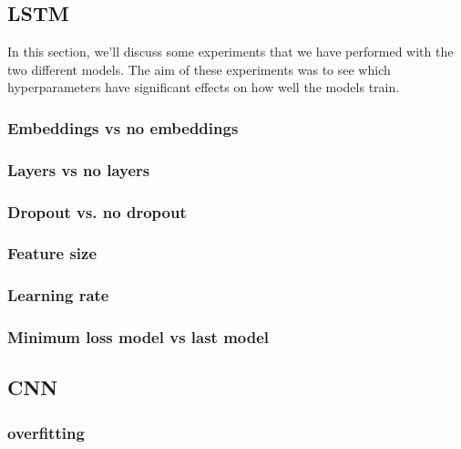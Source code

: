 \subsection{LSTM}  %
In this section, we'll discuss some experiments that we have performed with the two different models. The aim of these experiments was to see which hyperparameters have significant effects on how well the models train.

\subsubsection{Embeddings vs no embeddings} %

\subsubsection{Layers vs no layers}

\subsubsection{Dropout vs. no dropout} %


\subsubsection{Feature size} %

\subsubsection{Learning rate} %


\subsubsection{Minimum loss model vs last model} %



\subsection{CNN} %
\subsubsection{overfitting} %